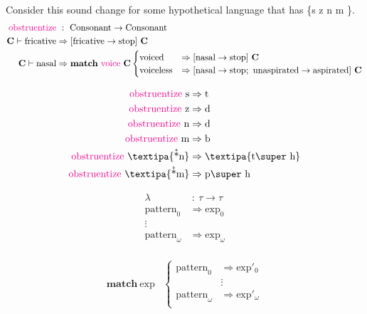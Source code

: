 \documentclass{report}[12pt]
\begin{document}
Consider this sound change for some hypothetical language that has \{s z n m  \}.
\begin{align*}
  \text{\textcolor{magenta}{obstruentize}} &\ :\ \text{Consonant} \rightarrow \text{Consonant} \\
  \textbf{C} \vdash \text{fricative} & \Rightarrow [\text{fricative} \rightarrow \text{stop}]\ \textbf{C} \\
  \textbf{C} \vdash \text{nasal} & \Rightarrow \textbf{match}\ \text{\textcolor{magenta}{voice}}\ \textbf{C}
                                   \begin{cases}
                                     \text{voiced} & \Rightarrow [\text{nasal} \rightarrow \text{stop}]\ \textbf{C} \\
                                     \text{voiceless} & \Rightarrow [\text{nasal} \rightarrow \text{stop};\ \text{unaspirated} \rightarrow \text{aspirated}]\ \textbf{C} \\
                                   \end{cases}
\end{align*}

\begin{align*}
  \text{\textcolor{magenta}{obstruentize}}\ \text{s} & \Rightarrow \text{t} \\
  \text{\textcolor{magenta}{obstruentize}}\ \text{z} & \Rightarrow \text{d} \\
  \text{\textcolor{magenta}{obstruentize}}\ \text{n} & \Rightarrow \text{d} \\
  \text{\textcolor{magenta}{obstruentize}}\ \text{m} & \Rightarrow \text{b} \\
  \text{\textcolor{magenta}{obstruentize}}\ \text{\textipa{\r*n}} & \Rightarrow \text{\textipa{t\super h}} \\
  \text{\textcolor{magenta}{obstruentize}}\ \text{\textipa{\r*m}} & \Rightarrow \text{p\super h} \\
\end{align*}

\begin{align*}
  \lambda &\ :\ \tau \rightarrow \tau \\
  \text{pattern}_0 & \Rightarrow \text{exp}_0 \\
  \vdots & \\
  \text{pattern}_\omega & \Rightarrow \text{exp}_\omega \\
\end{align*}

\begin{align*}
  \textbf{match}\ \text{exp} & \begin{cases}
                                 \text{pattern}_0 & \Rightarrow \text{exp}'_0 \\
                                                  & \vdots \\
                                 \text{pattern}_\omega & \Rightarrow \text{exp}'_\omega \\
                               \end{cases}\\
\end{align*}
\end{document}
